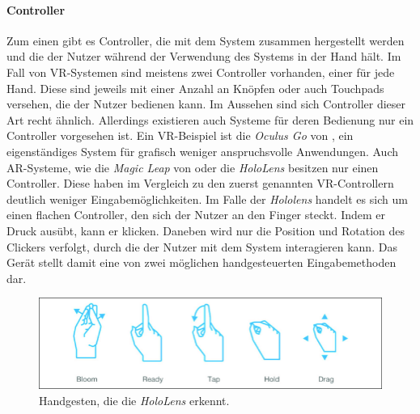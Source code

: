 \paragraph{Controller}
Zum einen gibt es Controller, die mit dem System zusammen hergestellt werden und die der Nutzer während der Verwendung des Systems in der Hand hält. Im Fall von VR-Systemen sind meistens zwei Controller vorhanden, einer für jede Hand. Diese sind jeweils mit einer Anzahl an Knöpfen oder auch Touchpads versehen, die der Nutzer bedienen kann. Im Aussehen sind sich Controller dieser Art recht ähnlich. %
Allerdings existieren auch Systeme für deren Bedienung nur ein Controller vorgesehen ist. Ein VR-Beispiel ist die \textit{Oculus Go} von \cite{oculus}, ein eigenständiges System für grafisch weniger anspruchsvolle Anwendungen. 
Auch AR-Systeme, wie die \textit{Magic Leap} von \cite{magicLeap} oder die \textit{HoloLens} besitzen nur einen Controller. Diese haben im Vergleich zu den zuerst genannten VR-Controllern deutlich weniger Eingabemöglichkeiten. Im Falle der \textit{Hololens} handelt es sich um einen flachen Controller, den sich der Nutzer an den Finger steckt. Indem er Druck ausübt, kann er klicken. Daneben wird nur die Position und Rotation des Clickers verfolgt, durch die der Nutzer mit dem System interagieren kann. Das Gerät stellt damit eine von zwei möglichen handgesteuerten Eingabemethoden dar. 

\begin{figure}[!htb]
	\centering
	\includegraphics[width=0.7\linewidth]{images/hololensGestures.png}
	\caption{Handgesten, die die \textit{HoloLens} erkennt.}
	\label{img:hololensGestures}
\end{figure}
\FloatBarrier

